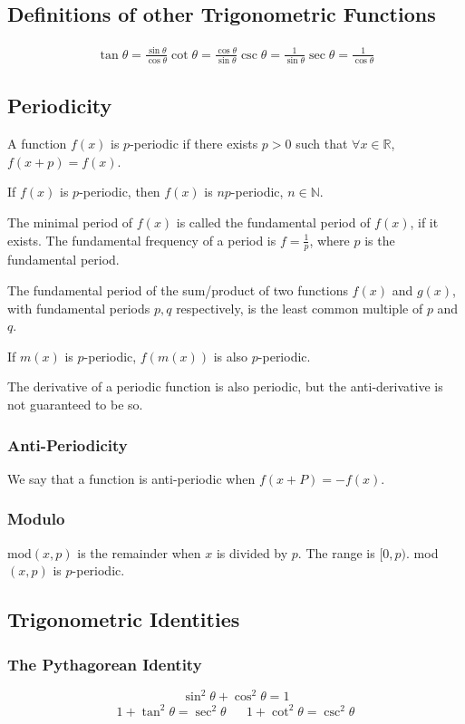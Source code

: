\documentclass{article}
\begin{document}
\subsection{Definitions of other Trigonometric Functions}
\begin{align}
    \tan{\theta} = \frac{\sin{\theta}}{\cos{\theta}}
    \cot{\theta} = \frac{\cos{\theta}}{\sin{\theta}}
    \csc{\theta} = \frac{1}{\sin{\theta}}
    \sec{\theta} = \frac{1}{\cos{\theta}}
\end{align}

\subsection{Periodicity}
A function $f(x)$ is $p$-periodic if there exists $p>0$ such that $\forall x \in \mathbb{R}$, $f(x+p)=f(x)$.

If $f(x)$ is $p$-periodic, then $f(x)$ is $np$-periodic, $n\in\mathbb{N}$.

The minimal period of $f(x)$ is called the fundamental period of $f(x)$, if it exists. The fundamental frequency of a period is $f=\frac{1}{p}$, where $p$ is the fundamental period.

The fundamental period of the sum/product of two functions $f(x)$ and $g(x)$, with fundamental periods $p,q$ respectively, is the least common multiple of $p$ and $q$.

If $m(x)$ is $p$-periodic, $f(m(x))$ is also $p$-periodic.

The derivative of a periodic function is also periodic, but the anti-derivative is not guaranteed to be so.

\subsubsection{Anti-Periodicity}
We say that a function is anti-periodic when $f(x+P)=-f(x)$.

\subsubsection{Modulo}
mod${\left(x,p\right)}$ is the remainder when $x$ is divided by $p$. The range is $[0,p)$. mod${\left(x,p\right)}$ is $p$-periodic.

\subsection{Trigonometric Identities}
\subsubsection{The Pythagorean Identity} \label{pythagorean}
$$\sin^2{\theta}+\cos^2{\theta}=1$$
\begin{align*}
    1+\tan^2{\theta}=\sec^2{\theta}&&
    1+\cot^2{\theta}=\csc^2{\theta}
\end{align*}
\end{document}
